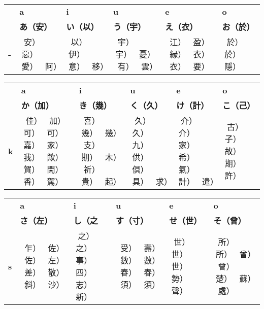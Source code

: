 \bigskip
\begin{center}
\Huge

\begin{tabular}{m{1.0cm}||m{2.5cm}|m{2.5cm}|m{2.5cm}|m{2.5cm}|m{2.5cm}|}
& \textbf{a}& \textbf{i}& \textbf{u}& \textbf{e}& \textbf{o}\\
& \textbf{あ（安）}& \textbf{い（以）}& \textbf{う（宇）}& \textbf{え（衣）}& \textbf{お（於）}\\ \hline \hline
\textbf{-}&\smallskip 𛀂（安） 𛀅（惡） 𛀃（愛） 𛀄（阿）
          &\smallskip 𛀆（以） 𛀇（伊） 𛀈（意） 𛀉（移）
          &\smallskip 𛀊（宇） 𛀋（宇） 𛀌（憂） 𛀍（有） 𛀎（雲）
          &\smallskip 𛀁（江） 𛀏（盈） 𛀐（縁） 𛀑（衣） 𛀒（衣） 𛀓（要）
          &\smallskip 𛀔（於） 𛀕（於） 𛀖（隱） \\ \hline
\end{tabular}

\begin{tabular}{m{1.0cm}||m{2.5cm}|m{2.5cm}|m{2.5cm}|m{2.5cm}|m{2.5cm}|}
& \textbf{a}& \textbf{i}& \textbf{u}& \textbf{e}& \textbf{o}\\
& \textbf{か（加）}& \textbf{き（幾）}& \textbf{く（久）}& \textbf{け（計）}& \textbf{こ（己）}\\ \hline \hline
\textbf{k}&\smallskip 𛀗（佳） 𛀘（加） 𛀙（可） 𛀚（可） 𛀛（嘉） 𛀢（家） 𛀜（我） 𛀝（歟） 𛀞（賀） 𛀟（閑） 𛀠（香） 𛀡（駕）
          &\smallskip 𛀣（喜） 𛀤（幾） 𛀥（幾） 𛀦（支） 𛀻（期） 𛀧（木） 𛀨（祈） 𛀩（貴） 𛀪（起）
          &\smallskip 𛀫（久） 𛀬（久） 𛀭（九） 𛀮（供） 𛀯（倶） 𛀰（具） 𛀱（求）
          &\smallskip 𛀳（介） 𛀲（介） 𛀢（家） 𛀴（希） 𛀵（氣） 𛀶（計） 𛀷（遣）
          &\smallskip 𛀸（古） 𛂘（子） 𛀹（故） 𛀻（期） 𛀺（許） \\ \hline
\end{tabular}

\begin{tabular}{m{1.0cm}||m{2.5cm}|m{2.5cm}|m{2.5cm}|m{2.5cm}|m{2.5cm}|}
& \textbf{a}& \textbf{i}& \textbf{u}& \textbf{e}& \textbf{o}\\
& \textbf{さ（左）}& \textbf{し（之}& \textbf{す（寸）}& \textbf{せ（世）}& \textbf{そ（曾）}\\ \hline \hline
\textbf{s}&\smallskip 𛀼（乍） 𛀽（佐） 𛀾（佐） 𛀿（左） 𛁀（差） 𛁁（散） 𛁂（斜） 𛁃（沙）
          &\smallskip 𛁄（之） 𛁅（之） 𛁆（事） 𛁇（四） 𛁈（志） 𛁉（新）
          &\smallskip 𛁊（受） 𛁋（壽） 𛁌（數） 𛁍（數） 𛁎（春） 𛁏（春） 𛁐（須） 𛁑（須）
          &\smallskip 𛁒（世） 𛁓（世） 𛁔（世） 𛁕（勢） 𛁖（聲）
          &\smallskip 𛁗（所） 𛁘（所） 𛁙（曾） 𛁚（曾） 𛁛（楚） 𛁜（蘇） 𛁝（處） \\ \hline
\end{tabular}


\end{center}
